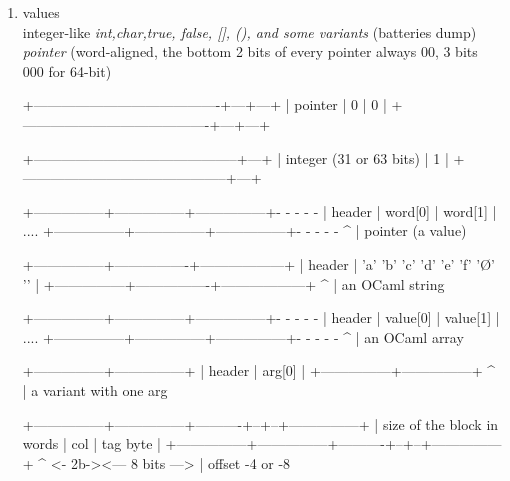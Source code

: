 \begin{enumerate}
\item values \\
  integer-like \textit{int,char,true, false, [], (), and some variants} (batteries dump)
  \textit{pointer} (word-aligned, the bottom 2 bits of every pointer always 00,
  3 bits 000 for 64-bit)

\begin{bluetext}
+----------------------------------------+---+---+
| pointer                                | 0 | 0 |
+----------------------------------------+---+---+

+--------------------------------------------+---+
| integer (31 or 63 bits)                    | 1 |
+--------------------------------------------+---+


+---------------+---------------+---------------+- - - - -
| header        | word[0]       | word[1]       | ....
+---------------+---------------+---------------+- - - - -
                  ^
                  |
              pointer (a value)


+---------------+----------------+------------------+
| header        | 'a' 'b' 'c' 'd' 'e' 'f' '\O' '\1' |
+---------------+----------------+------------------+
                  ^
                  |
              an OCaml string

+---------------+---------------+---------------+- - - - -
| header        | value[0]      | value[1]      | ....
+---------------+---------------+---------------+- - - - -
                  ^
                  |
              an OCaml array

+---------------+---------------+
| header        | arg[0]        |
+---------------+---------------+
                  ^
                  |
              a variant with one arg


+---------------+---------------+----------+--+--+---------------+
| size of the block in words               | col | tag byte      |
+---------------+---------------+----------+--+--+---------------+
 ^                                         <- 2b-><--- 8 bits --->
 |
offset -4 or -8




\end{bluetext}
\end{enumerate}
